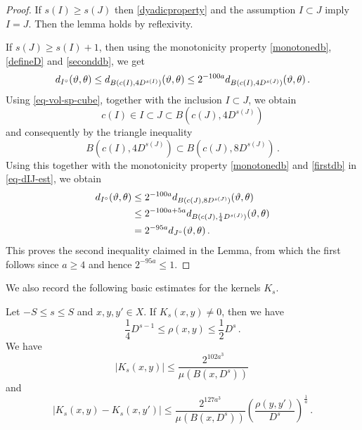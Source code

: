 \begin{proof}
    \leanok
    If $s(I) \ge s(J)$ then \eqref{dyadicproperty} and the assumption $I\subset J$ imply $I = J$. Then the lemma holds by reflexivity.

    If $s(J) \ge s(I)+1$, then using the monotonicity property \eqref{monotonedb}, \eqref{defineD} and \eqref{seconddb}, we get
    \begin{equation}
    \label{eq-dIJ-est}
        d_{I^\circ}({\vartheta}, {\theta}) \le d_{B(c(I), 4 D^{s(I)})}({\vartheta}, {\theta}) \le 2^{-100a} d_{B(c(I), 4D^{s(J)})}({\vartheta}, {\theta})\,.
    \end{equation}
    Using \eqref{eq-vol-sp-cube}, together with the inclusion $I \subset J$, we obtain
    $$
        c(I) \in I \subset J \subset B(c(J), 4 D^{s(J)})
    $$
    and consequently by the triangle inequality
    $$
        B(c(I), 4 D^{s(J)}) \subset B(c(J), 8 D^{s(J)})\,.
    $$
    Using this together with the monotonicity property \eqref{monotonedb} and \eqref{firstdb} in \eqref{eq-dIJ-est}, we obtain
    \begin{align*}
        d_{I^\circ}({\vartheta}, {\theta}) &\le 2^{-100a} d_{B(c(J), 8D^{s(J)})}({\vartheta}, {\theta})\\
        &\le 2^{-100a + 5a} d_{B(c(J), \frac{1}{4}D^{s(J)})}({\vartheta}, {\theta})\\
        &= 2^{-95a}d_{J^\circ}({\vartheta}, {\theta})\,.
    \end{align*}
    This proves the second inequality claimed in the Lemma, from which the first follows since $a \ge 4$ and hence $2^{-95a} \le 1$.
\end{proof}

We also record the following basic estimates for the kernels $K_s$.

\begin{lemma}
\label{kernel-summand}
\leanok
{}
    Let $-S\le s\le S$ and $x,y,y'\in X$.
    If $K_s(x,y)\neq 0$, then we have
    \begin{equation}\label{supp-Ks}
      \frac{1}{4} D^{s-1} \leq \rho(x,y) \leq \frac{1}{2} D^s\, .
    \end{equation}
    We have
    \begin{equation}
       \label{eq-Ks-size}
        |K_s(x,y)|\le \frac{2^{102 a^3}}{\mu(B(x, D^{s}))}\,
    \end{equation}
    and
    \begin{equation}
        \label{eq-Ks-smooth}
        |K_s(x,y)-K_s(x, y')|\le \frac{2^{127a^3}}{\mu(B(x, D^{s}))}
        \left(\frac{ \rho(y,y')}{D^s}\right)^{\frac 1a}\,.
    \end{equation}
\end{lemma}

